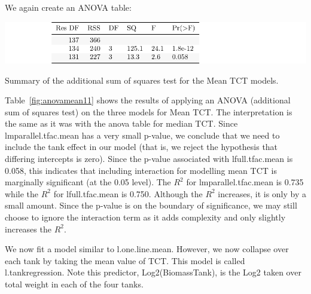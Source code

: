 \newpage

We again create an ANOVA table:

   \vspace{12pt}




\begin{table}[H]
\includegraphics{Chapter3Images/anovamean.pdf}
\caption{Summary of the additional sum of squares test for the Mean TCT models. }
\label{fig:anovamean11}
\end{table}


 
 Table~\ref{fig:anovamean11} shows the results of applying an ANOVA (additional sum of squares test) on the three models for Mean TCT. The interpretation is the same as it was with the anova table for median TCT. Since lmparallel.tfac.mean has a very small p-value, we conclude that we need to include the tank effect in our model (that is, we reject the hypothesis that differing intercepts is zero). 
Since the p-value associated with  lfull.tfac.mean is 0.058, this indicates that including interaction for modelling mean TCT is marginally significant (at the 0.05 level). The $R^{2}$ for lmparallel.tfac.mean is 0.735 while the $R^{2}$ for  lfull.tfac.mean is 0.750. Although the $R^{2}$ increases, it is only by a small amount. Since the p-value is on the boundary of significance, we may still choose to ignore the interaction term as it adds complexity and only slightly increases the $R^{2}$.

\newpage


We now fit a model similar to l.one.line.mean. However, we now collapse over each tank by taking the mean value of TCT. This model is called l.tankregression. Note this predictor, Log2(BiomassTank), is the Log2 taken over total weight in each of the four tanks.


